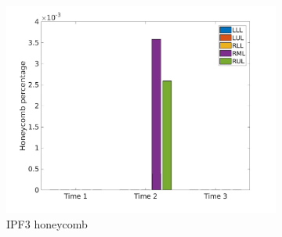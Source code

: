 \begin{figure}[H]
\begin{subfigure}{.46\linewidth}
  \includegraphics[width=\linewidth,trim={{.0\wd0} {.0\wd0} {.0\wd0} {.0\wd0}},clip]{Appendix/Image_AppexA/LobarDistribution/IPF3HoneycombLobarRegionDiseaseDistributionOverTime.jpg} %
  \caption{IPF3 honeycomb}
  \label{fig:IPF3LobarRegionDiseaseDistributionOverTime-c} 
\end{subfigure} 
\hspace{.3in}
\begin{subfigure}{.46\linewidth}%

\end{subfigure}
\end{figure}
